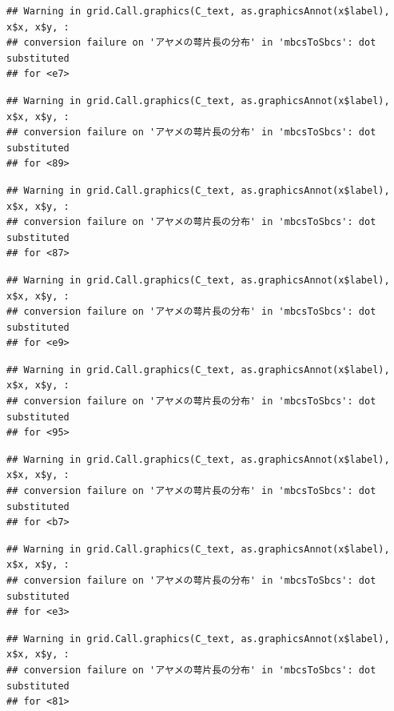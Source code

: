 \documentclass[
]{book}
\begin{document}
\begin{verbatim}
## Warning in grid.Call.graphics(C_text, as.graphicsAnnot(x$label), x$x, x$y, :
## conversion failure on 'アヤメの萼片長の分布' in 'mbcsToSbcs': dot substituted
## for <e7>
\end{verbatim}

\begin{verbatim}
## Warning in grid.Call.graphics(C_text, as.graphicsAnnot(x$label), x$x, x$y, :
## conversion failure on 'アヤメの萼片長の分布' in 'mbcsToSbcs': dot substituted
## for <89>
\end{verbatim}

\begin{verbatim}
## Warning in grid.Call.graphics(C_text, as.graphicsAnnot(x$label), x$x, x$y, :
## conversion failure on 'アヤメの萼片長の分布' in 'mbcsToSbcs': dot substituted
## for <87>
\end{verbatim}

\begin{verbatim}
## Warning in grid.Call.graphics(C_text, as.graphicsAnnot(x$label), x$x, x$y, :
## conversion failure on 'アヤメの萼片長の分布' in 'mbcsToSbcs': dot substituted
## for <e9>
\end{verbatim}

\begin{verbatim}
## Warning in grid.Call.graphics(C_text, as.graphicsAnnot(x$label), x$x, x$y, :
## conversion failure on 'アヤメの萼片長の分布' in 'mbcsToSbcs': dot substituted
## for <95>
\end{verbatim}

\begin{verbatim}
## Warning in grid.Call.graphics(C_text, as.graphicsAnnot(x$label), x$x, x$y, :
## conversion failure on 'アヤメの萼片長の分布' in 'mbcsToSbcs': dot substituted
## for <b7>
\end{verbatim}

\begin{verbatim}
## Warning in grid.Call.graphics(C_text, as.graphicsAnnot(x$label), x$x, x$y, :
## conversion failure on 'アヤメの萼片長の分布' in 'mbcsToSbcs': dot substituted
## for <e3>
\end{verbatim}

\begin{verbatim}
## Warning in grid.Call.graphics(C_text, as.graphicsAnnot(x$label), x$x, x$y, :
## conversion failure on 'アヤメの萼片長の分布' in 'mbcsToSbcs': dot substituted
## for <81>
\end{verbatim}
\end{document}
